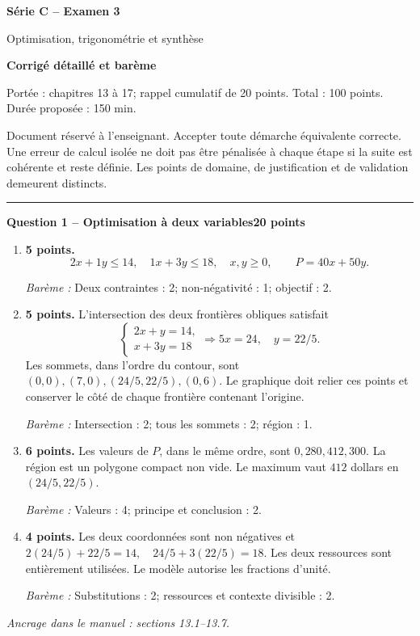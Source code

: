 \documentclass[11pt,a4paper]{article}
\begin{document}
{\LARGE\bfseries Série C -- Examen 3}\par
{\large Optimisation, trigonométrie et synthèse}\par
\textbf{Corrigé détaillé et barème}\par
Portée : chapitres 13 à 17; rappel cumulatif de 20 points. Total : 100 points. Durée proposée : 150 min.\par
\small Document réservé à l’enseignant. Accepter toute démarche équivalente correcte. Une erreur de calcul isolée ne doit pas être pénalisée à chaque étape si la suite est cohérente et reste définie. Les points de domaine, de justification et de validation demeurent distincts.\normalsize\par
\vspace{3mm}\hrule\vspace{4mm}
{\large\bfseries Question 1 -- Optimisation à deux variables}\hfill\textbf{20 points}\par
\begin{enumerate}
\item \textbf{5 points.} \[2x+1y\le 14,\quad 1x+3y\le 18,\quad x,y\ge0,\qquad P=40x+50y.\]
\par{\small\textit{Barème : }Deux contraintes : 2; non-négativité : 1; objectif : 2.}
\item \textbf{5 points.} L’intersection des deux frontières obliques satisfait \[\begin{cases}2x+y=14,\\x+3y=18\end{cases}\Longrightarrow5x=24,\quad y=22/5.\] Les sommets, dans l’ordre du contour, sont \((0,0),(7,0),(24/5,22/5),(0,6)\). Le graphique doit relier ces points et conserver le côté de chaque frontière contenant l’origine.
\par{\small\textit{Barème : }Intersection : 2; tous les sommets : 2; région : 1.}
\item \textbf{6 points.} Les valeurs de \(P\), dans le même ordre, sont \(0,280,412,300\). La région est un polygone compact non vide. Le maximum vaut \(412\) dollars en \((24/5,22/5)\).
\par{\small\textit{Barème : }Valeurs : 4; principe et conclusion : 2.}
\item \textbf{4 points.} Les deux coordonnées sont non négatives et \(2(24/5)+22/5=14,\quad24/5+3(22/5)=18\). Les deux ressources sont entièrement utilisées. Le modèle autorise les fractions d’unité.
\par{\small\textit{Barème : }Substitutions : 2; ressources et contexte divisible : 2.}
\end{enumerate}
\vfill {\small\textit{Ancrage dans le manuel : sections 13.1--13.7.}}
\end{document}

